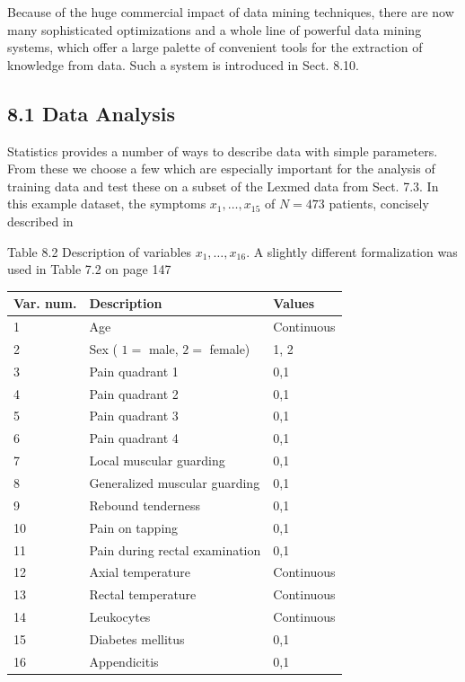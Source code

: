 \documentclass[10pt]{article}
\begin{document}
Because of the huge commercial impact of data mining techniques, there are now many sophisticated optimizations and a whole line of powerful data mining systems, which offer a large palette of convenient tools for the extraction of knowledge from data. Such a system is introduced in Sect. 8.10.

\subsection*{8.1 Data Analysis}
Statistics provides a number of ways to describe data with simple parameters. From these we choose a few which are especially important for the analysis of training data and test these on a subset of the Lexmed data from Sect. 7.3. In this example dataset, the symptoms $x_{1}, \ldots, x_{15}$ of $N=473$ patients, concisely described in

Table 8.2 Description of variables $x_{1}, \ldots, x_{16}$. A slightly different formalization was used in Table 7.2 on page 147


\begin{center}
\begin{tabular}{|l|l|l|}
\hline
Var. num. & Description & Values \\
\hline
1 & Age & Continuous \\
\hline
2 & Sex ( $1=$ male, $2=$ female) & 1, 2 \\
\hline
3 & Pain quadrant 1 & 0,1 \\
\hline
4 & Pain quadrant 2 & 0,1 \\
\hline
5 & Pain quadrant 3 & 0,1 \\
\hline
6 & Pain quadrant 4 & 0,1 \\
\hline
7 & Local muscular guarding & 0,1 \\
\hline
8 & Generalized muscular guarding & 0,1 \\
\hline
9 & Rebound tenderness & 0,1 \\
\hline
10 & Pain on tapping & 0,1 \\
\hline
11 & Pain during rectal examination & 0,1 \\
\hline
12 & Axial temperature & Continuous \\
\hline
13 & Rectal temperature & Continuous \\
\hline
14 & Leukocytes & Continuous \\
\hline
15 & Diabetes mellitus & 0,1 \\
\hline
16 & Appendicitis & 0,1 \\

\hline
\end{tabular}
\end{center}
\end{document}
